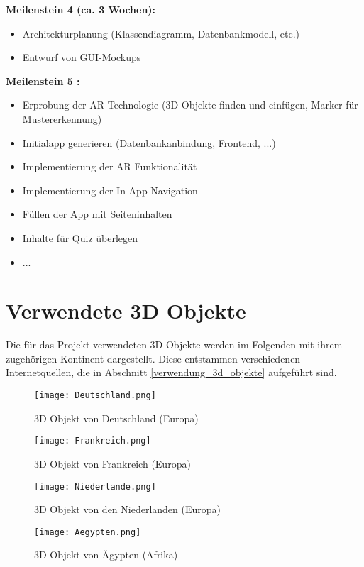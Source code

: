 \textbf{Meilenstein 4  (ca. 3 Wochen):}
\begin{itemize}
\item Architekturplanung (Klassendiagramm, Datenbankmodell, etc.)
\item Entwurf von GUI-Mockups
\end{itemize}

\textbf{Meilenstein 5 :}
\begin{itemize}
\item Erprobung der AR Technologie (3D Objekte finden und einfügen, Marker für Mustererkennung)
\item Initialapp generieren (Datenbankanbindung, Frontend, ...)
\item Implementierung der AR Funktionalität
\item Implementierung der In-App Navigation
\item Füllen der App mit Seiteninhalten
\item Inhalte für Quiz überlegen
\item ...
\end{itemize}

\section{Verwendete 3D Objekte}
Die für das Projekt verwendeten 3D Objekte werden im Folgenden mit ihrem zugehörigen Kontinent dargestellt. Diese entstammen verschiedenen Internetquellen, die in Abschnitt \ref{verwendung_3d_objekte} aufgeführt sind.

\begin{figure}[!htb]
  \texttt{[image: Deutschland.png]}
  \caption{3D Objekt von Deutschland (Europa)}\label{fig:deutschland}
\endminipage\hfill
{}
  \texttt{[image: Frankreich.png]}
  \caption{3D Objekt von Frankreich (Europa)}\label{fig:frankreich}
\endminipage\hfill
\end{figure}

\begin{figure}[!htb]
  \texttt{[image: Niederlande.png]}
  \caption{3D Objekt von den Niederlanden (Europa)}\label{fig:niederlande}
\endminipage\hfill
{}
  \texttt{[image: Aegypten.png]}
  \caption{3D Objekt von Ägypten (Afrika)}\label{fig:aegypten}
\endminipage\hfill
\end{figure}

